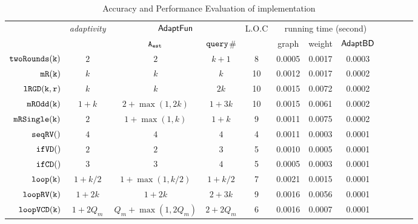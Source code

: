 {\scriptsize
\begin {table}[H]
\vspace{-0.5cm}
    \caption{Accuracy and Performance Evaluation of {\THESYSTEM} implementation}
    \vspace{-0.4cm}
        \label{tb:adapt-imp}
        \begin{center}
        \centering
{
        \begin{tabular}{| >{\tiny}r | c | c | c | c | c | c | c | c | c | c | c }
         \hline \hline
        \multirow{2}{*}{Program $c$} & 
        \multirow{2}{*}{\emph{adaptivity}}
         & \multicolumn{2}{c|}{$\textsf{AdaptFun}$}
         & \multirow{2}{*}{L.O.C}
         & \multicolumn{3}{c|}{running time (second)} \\ 
         \cline{3-4} \cline{6-8}
         & & {${\mathtt{A_{est}}}$ } & {${\tt query}$\# } &  & graph & weight & $\mathsf{AdaptBD}$ \\ 
         \cline{6-8}
         \hline \hline
         $  \mathtt{twoRounds(k)}$ & $2$ &  $2$ & $k+1 $  & 8 & 0.0005 & 0.0017 & 0.0003 \\
         $  \mathtt{mR(k)}$ & $k$ &  $k$ & $k$  &  10 & 0.0012 & 0.0017  & 0.0002 \\
         $  \mathtt{lRGD(k, r)}$ & $k$ & $k  $ & $ 2k $  &  10 & 0.0015 & 0.0072  & 0.0002  \\
         $  \mathtt{mROdd(k)}$ & $1 + k$ &  $2+\max(1,2k)  $ & $1 + 3 k  $  &  10 & 0.0015 & 0.0061  & 0.0002 \\
         $  \mathtt{mRSingle(k)}$    & $2$ &  $1+ \max(1, k) $ & $1 + k $  &  9 & 0.0011 & 0.0075  & 0.0002 \\
         $  \mathtt{seqRV()}$ & $4$ & $4$ &  $4$ & 4 & 0.0011 & 0.0003 & 0.0001 \\  
         $  \mathtt{ifVD()}$ & $2$ & $2$ &  $3$ & 5 & 0.0010 & 0.0005  & 0.0001 \\
         $  \mathtt{ifCD()}$ & $3$ & $3 $ &   $4$  & 5 & 0.0005 & 0.0003   & 0.0001 \\
         $  \mathtt{loop(k)}$ & $1+k/2$ &   $1 +\max(1, k/2)  $  &  $1+k/2  $ & 7 & 0.0021 & 0.0015 &  0.0001 \\
         $  \mathtt{loopRV(k)}$ & $1 + 2k$ &  $1 + 2k$ & $2 + 3 k$  &  9 & 0.0016 & 0.0056 & 0.0001  \\
         $  {\mathtt{loopVCD(k)}} $ & ${1 + 2Q_m}$ &  ${Q_m+\max(1,2Q_m)}$  & $2+2Q_m$   &  6 & 0.0016 & 0.0007 & 0.0001 \\

\end{tabular}}
\end{center}
\end{table}}
